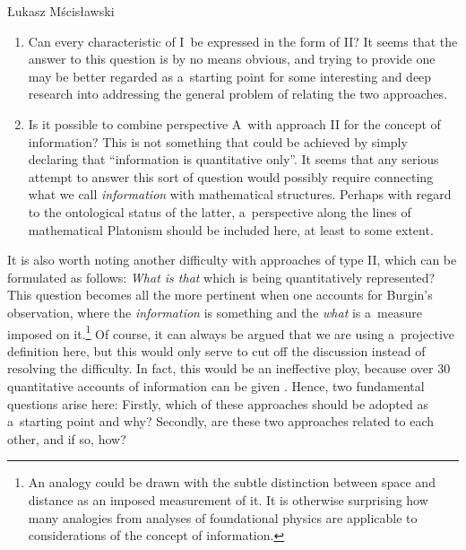 \begin{artengenv}{Łukasz Mścisławski}
\begin{enumerate}
\item Can every characteristic of I~be expressed in the form of II? It seems that the answer to this question is by no means obvious, and trying to provide one may be better regarded as a~starting point for some interesting and deep research into addressing the general problem of relating the two approaches.
\item Is it possible to combine perspective A~with approach II for the concept of information? This is not something that could be achieved by simply declaring that ``information is quantitative only''. It seems that any serious attempt to answer this sort of question would possibly require connecting what we call \textit{information} with mathematical structures. Perhaps with regard to the ontological status of the latter, a~perspective along the lines of mathematical Platonism should be included here, at least to some extent.
\end{enumerate}
It is also worth noting another difficulty with approaches of type II, which can be formulated as follows: \textit{What is that} which is being quantitatively represented? This question becomes all the more pertinent when one accounts for Burgin's
\parencite*[][p.349]{burgin_information_2011} %
 observation, where the \textit{information} is something and the \textit{what} is a~measure imposed on it.\footnote{An analogy could be drawn with the subtle distinction between space and distance as an imposed measurement of it. It is otherwise surprising how many analogies from analyses of foundational physics are applicable to considerations of the concept of information.} Of course, it can always be argued that we are using a~projective definition here, but this would only serve to cut off the discussion instead of resolving the difficulty. In fact, this would be an ineffective ploy, because over 30 quantitative accounts of information can be given 
\parencite[][pp.131–133]{burgin_theory_2010}. %
 Hence, two fundamental questions arise here: Firstly, which of these approaches should be adopted as a~starting point and why? Secondly, are these two approaches related to each other, and if so, how?


\end{artengenv}
